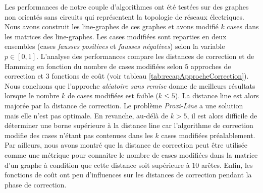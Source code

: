 
Les performances de notre couple d'algorithmes ont \'et\'e test\'ees sur des graphes non orient\'es sans circuits qui repr\'esentent la topologie de r\'eseaux \'electriques. Nous avons construit les line-graphes de ces graphes et avons modifi\'e $k$ cases dans les matrices des line-graphes. Les cases modifi\'ees sont reparties en deux ensembles (cases {\em fausses positives} et {\em fausses n\'egatives}) selon la variable $p \in [0,1]$.
L'analyse des performances compare les distances de correction et de Hamming en fonction du nombre de cases modifi\'ees selon $5$ approches de correction et $3$ fonctions de co\^ut (voir tableau \ref{tab:recapApprocheCorrection}). 
Nous concluons que l'approche {\em al\'eatoire sans remise} donne de meilleurs r\'esultats lorsque le nombre $k$ de cases modifi\'ees est faible ($k\le 5$). La distance line est alors major\'ee par la distance de correction.  Le probl\`eme {\em Proxi-Line} a une solution mais elle n'est pas optimale.
En revanche, au-d\'el\`a de $k > 5$, il est alors difficile de d\'eterminer une borne sup\'erieure \`a la distance line car l'algorithme de correction  modifie des cases n'\'etant pas contenues dans les $k$ cases modifi\'ees pr\'ealablement. 
Par ailleurs, nous avons montr\'e que la distance de correction peut \^etre utilis\'ee comme une m\'etrique pour connaitre le nombre de cases modifi\'ees dans la matrice d'un graphe \`a condition que cette distance soit sup\'erieure \`a $10$ ar\^etes. 
Enfin, les fonctions de co\^ut ont peu d'influences sur les distances de correction pendant la phase de correction.

